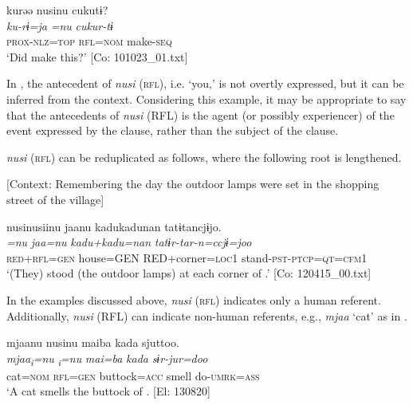 {\MY}
\glll  kurəə  nusinu  cukutɨ?\\
    \textit{ku-rɨ=ja}  \textit{=nu}  \textit{cukur-tɨ}\\
    \textsc{prox}-\textsc{nlz}=\textsc{top}  \textsc{rfl}=\textsc{nom}  make-\textsc{seq}\\
    \glt [lit.] ‘Did  make this?’ [Co: 101023\_01.txt]

\z

In , the antecedent of \textit{nusi} (\textsc{rfl}), i.e. ‘you,’ is not overtly expressed, but it can be inferred from the context. Considering this example, it may be appropriate to say that the antecedents of \textit{nusi} (RFL) is the agent (or possibly experiencer) of the event expressed by the clause, rather than the subject of the clause.

\textit{nusi} (\textsc{rfl}) can be reduplicated as follows, where the following root is lengthened.

\ea \label{ex:7:10}  [Context: Remembering the day the outdoor lamps were set in the shopping street of the village]

{\TM}
\glll  nusinusiinu  jaanu  kadukadunan  tatɨtancjɨjo.\\
\textit{=nu}  \textit{jaa=nu}  \textit{kadu+kadu=nan}  \textit{tatɨr-tar-n=ccjɨ=joo}\\
\textsc{red}+\textsc{rfl}=\textsc{gen}  house=GEN  RED+corner=\textsc{loc}1  stand-\textsc{pst}-\textsc{ptcp}=\textsc{qt}=\textsc{cfm}1\\
\glt ‘(They) stood (the outdoor lamps) at each corner of .’ [Co: 120415\_00.txt]

\z

  In the examples discussed above, \textit{nusi} (\textsc{rfl}) indicates only a human referent. Additionally, \textit{nusi} (RFL) can indicate non-human referents, e.g., \textit{mjaa} ‘cat’ as in .

\ea \label{ex:7:11}{\TM}
\glll  mjaanu  nusinu  maiba  kada  sjuttoo.\\
\textit{mjaa\textsubscript{i}}\textit{=nu}  \textit{\textsubscript{i}}\textit{=nu}  \textit{mai=ba}  \textit{kada}  \textit{sɨr-jur=doo}\\
cat=\textsc{nom}  \textsc{rfl}=\textsc{gen}  buttock=\textsc{acc}  smell  do-\textsc{umrk}=\textsc{ass}\\
\glt ‘A cat smells the buttock of . [El: 130820]

